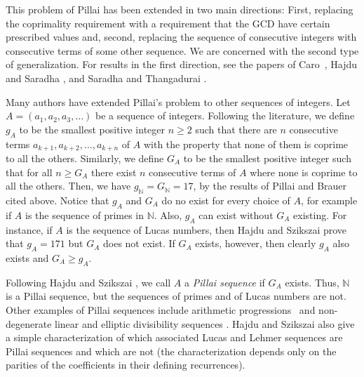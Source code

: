 \documentclass[11pt]{article}
\newcommand{\N}{\mathbb{N}}
\begin{document}
This problem of Pillai has been extended in two main directions: First, replacing the coprimality requirement with a requirement that the GCD have certain prescribed values and, second, replacing the sequence of consecutive integers with consecutive terms of some other sequence.  We are concerned with the second type of generalization. For results in the first direction, see the papers of Caro~\cite{caro}, Hajdu and Saradha \cite{hajdu1}, and Saradha and Thangadurai \cite{saradha}.

Many authors have extended Pillai's problem to other sequences of integers.  Let $A=(a_1, a_2, a_3, \ldots)$ be a sequence of integers.
Following the literature, we define $g_A$ to be the smallest positive integer $n\geq 2$ such that there are $n$ consecutive terms $a_{k+1}, a_{k+2}, \ldots, a_{k+n}$ of $A$ with the property that none of them is coprime to all the others. Similarly, we define $G_A$ to be the smallest positive integer such that for all $n\geq G_A$ there exist $n$ consecutive terms of $A$ where none  is coprime to all the others.  Then, we have $g_\N=G_\N=17$, by the results of Pillai and Brauer cited above. Notice that $g_A$ and $G_A$ do no exist for every choice of $A$, for example if $A$ is the sequence of primes in $\N$. Also, $g_A$ can exist without $G_A$ existing.  For instance, if $A$ is the sequence of Lucas numbers, then Hajdu and Szikszai \cite{hajdu4} prove that $g_A=171$ but $G_A$ does not exist. If $G_A$ exists, however, then clearly $g_A$ also exists and $G_A\geq g_A$.

Following 
Hajdu and Szikszai \cite{hajdu2}, we call $A$ a {\em Pillai sequence} if $G_A$ exists.  Thus, $\N$ is a Pillai sequence, but the sequences of primes and of Lucas numbers are not.  Other examples of Pillai sequences include arithmetic progressions~\cite{evans2} and  non-degenerate linear and elliptic divisibility sequences \cite{hajdu2, hajdu3}. Hajdu and Szikszai \cite{hajdu4} also give a simple characterization of which associated Lucas and Lehmer sequences are Pillai sequences and which are not (the characterization depends only on the parities of the coefficients in their defining recurrences).
\end{document}
